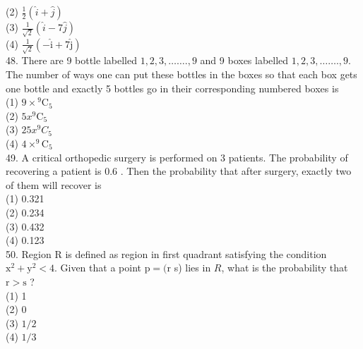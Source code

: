 \documentclass[10pt]{article}
\begin{document}
(2) $\frac{1}{2}(\hat{i}+\hat{j})$\\
(3) $\frac{1}{\sqrt{2}}(\hat{i}-7 \hat{j})$\\
(4) $\frac{1}{\sqrt{2}}(-\hat{\mathrm{i}}+7 \hat{\mathrm{j}})$\\
48. There are 9 bottle labelled $1,2,3, \ldots \ldots ., 9$ and 9 boxes labelled $1,2,3, \ldots \ldots ., 9$. The number of ways one can put these bottles in the boxes so that each box gets one bottle and exactly 5 bottles go in their corresponding numbered boxes is\\
(1) $9 \times{ }^{9} \mathrm{C}_{5}$\\
(2) $5 x^{9} \mathrm{C}_{5}$\\
(3) $25 x^{9} C_{5}$\\
(4) $4 \times^{9} \mathrm{C}_{5}$\\
49. A critical orthopedic surgery is performed on 3 patients. The probability of recovering a patient is 0.6 . Then the probability that after surgery, exactly two of them will recover is\\
(1) 0.321\\
(2) 0.234\\
(3) 0.432\\
(4) 0.123\\
50. Region R is defined as region in first quadrant satisfying the condition $\mathrm{x}^{2}+\mathrm{y}^{2}<4$. Given that a point $\mathrm{p}=(\mathrm{r}$ s) lies in $R$, what is the probability that $\mathrm{r}>\mathrm{s}$ ?\\
(1) 1\\
(2) 0\\
(3) $1 / 2$\\
(4) $1 / 3$
\end{document}
